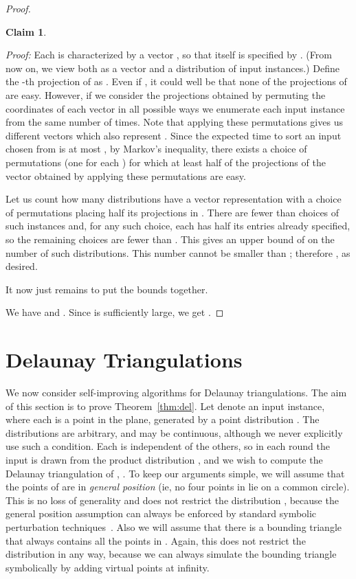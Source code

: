 \documentclass{siamltex}
\newtheorem{claim}[theorem]{Claim}
\begin{document}
\begin{proof}
\begin{claim}
\end{claim} 

\emph{Proof:} 
Each  is characterized by a vector 
, so that 
 itself is specified by 
. (From now on,
we view  both as a vector and a distribution of input instances.)
Define the -th projection of  as .
Even if , 
it could well be that none of the 
projections of  are easy. However, if we consider
the projections obtained by permuting the coordinates
of each vector  in all possible
ways we enumerate each input instance from  
the same number of times. 
Note that applying these permutations gives us different vectors which also 
represent .
Since the expected time to sort an input chosen from 
is at most ,
by Markov's inequality, there exists a choice of permutations 
(one for each ) for which at least half of 
the projections of the vector obtained by applying these permutations are easy. 

Let us count how many distributions have a vector representation with a choice
of permutations placing half its projections in .
There are fewer than 
choices of such instances and, for any such choice, 
each  has half its entries
already specified, so the remaining choices are fewer
than . This gives an upper bound of 
 on the number of such distributions.
This number cannot be smaller than 
; therefore
, as desired. \qquad \endproof
\medskip

It now just remains to put the bounds together.

We have  and . 
Since  is sufficiently large,
we get .
\end{proof}


\section{Delaunay Triangulations}\label{sec:delaunay}

We now consider self-improving algorithms for Delaunay triangulations.
The aim of this section is to prove Theorem~\ref{thm:del}.
Let  denote an input instance, where each
 is a point in the plane, generated
by a point distribution . The distributions 
are arbitrary, and may be continuous, although we never
explicitly use such a condition.
Each  is independent of the others, so in each round
the input  is drawn from the product distribution
,  
and we wish to compute the Delaunay
triangulation of , . 
To keep our arguments simple,
we will assume that the points of  are in \emph{general position} 
(ie, no four points in  lie on a common circle).
This is no loss of generality and does not restrict the distribution
, because the general position assumption can always be enforced
by standard symbolic perturbation techniques~\cite{EdelsbrunnerMu90}.
Also we will assume that there is a bounding triangle that always contains 
all the points in . Again, this does not
restrict the distribution  in any way, because we can always 
simulate the bounding triangle symbolically by adding virtual points
at infinity.
\end{document}
